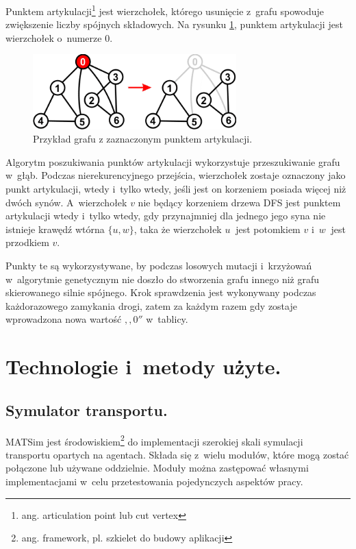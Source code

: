 \documentclass[twoside,12pt]{report}
\let\oldsection\chapter
\def\chapter{\cleardoublepage\oldsection}
\begin{document}
Punktem artykulacji\footnote{ang. articulation point lub cut vertex} jest wierzchołek, którego usunięcie z~grafu spowoduje zwiększenie liczby spójnych składowych. Na rysunku \ref{artykulacja}, punktem artykulacji jest wierzchołek o~numerze $0$.

\begin{figure}[h]
\begin{center}
\includegraphics[width=0.7\textwidth]{img/articulation}
\caption{Przykład grafu z zaznaczonym punktem artykulacji.}
\label{artykulacja}
\end{center}
\end{figure}

Algorytm poszukiwania punktów artykulacji wykorzystuje przeszukiwanie grafu w~głąb. Podczas nierekurencyjnego przejścia, wierzchołek zostaje oznaczony jako punkt artykulacji, wtedy i~tylko wtedy, jeśli jest on korzeniem posiada więcej niż dwóch synów. A~wierzchołek $ v $ nie będący korzeniem drzewa DFS jest punktem artykulacji wtedy i~tylko wtedy, gdy przynajmniej dla jednego jego syna nie istnieje krawędź wtórna $ \{u,w\} $, taka że wierzchołek $ u~$ jest potomkiem $ v $ i~$ w~$ jest przodkiem $ v $.

Punkty te są wykorzystywane, by podczas losowych mutacji i~krzyżowań w~algorytmie genetycznym nie doszło do stworzenia grafu innego niż grafu skierowanego silnie spójnego. Krok sprawdzenia jest wykonywany podczas każdorazowego zamykania drogi, zatem za każdym razem gdy zostaje wprowadzona nowa wartość $,,0''$ w~tablicy.

\chapter{Technologie i~metody użyte.}\label{rozdz.technologie} 
\section{Symulator transportu.}

MATSim jest środowiskiem\footnote{ang. framework, pl. szkielet do budowy aplikacji} do implementacji szerokiej skali symulacji transportu opartych na agentach. Składa się z~wielu modułów, które mogą zostać połączone lub używane oddzielnie. Moduły można zastępować własnymi implementacjami w~celu przetestowania pojedynczych aspektów pracy\cite{matsim}.
\end{document}
